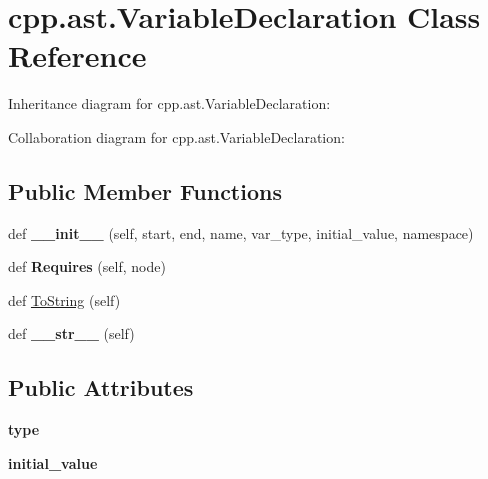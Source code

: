 \hypertarget{classcpp_1_1ast_1_1VariableDeclaration}{}\section{cpp.\+ast.\+Variable\+Declaration Class Reference}
\label{classcpp_1_1ast_1_1VariableDeclaration}


Inheritance diagram for cpp.\+ast.\+Variable\+Declaration\+:


Collaboration diagram for cpp.\+ast.\+Variable\+Declaration\+:
\subsection*{Public Member Functions}
\begin{DoxyCompactItemize}
\item 
\mbox{\label{classcpp_1_1ast_1_1VariableDeclaration_adc19909b6a3b2c2978b02044634fc13f}} 
def {\bfseries \+\_\+\+\_\+init\+\_\+\+\_\+} (self, start, end, name, var\+\_\+type, initial\+\_\+value, namespace)
\item 
\mbox{\label{classcpp_1_1ast_1_1VariableDeclaration_aaa1cae7cf191e6d561d861cd053a0bf4}} 
def {\bfseries Requires} (self, node)
\item 
def \hyperlink{classcpp_1_1ast_1_1VariableDeclaration_a047aa4afddf7b7823a4095cea9477a21}{To\+String} (self)
\item 
\mbox{\label{classcpp_1_1ast_1_1VariableDeclaration_a9f5c15731d1bdd8fe14c2a575e2f4fe6}} 
def {\bfseries \+\_\+\+\_\+str\+\_\+\+\_\+} (self)
\end{DoxyCompactItemize}
\subsection*{Public Attributes}
\begin{DoxyCompactItemize}
\item 
\mbox{\label{classcpp_1_1ast_1_1VariableDeclaration_a8c7cc8578ea12f93c6e1c5c6ef4ddf99}} 
{\bfseries type}
\item 
\mbox{\label{classcpp_1_1ast_1_1VariableDeclaration_a7c259ca42a06e264679e8ab66e7ea374}} 
{\bfseries initial\+\_\+value}
\end{DoxyCompactItemize}


